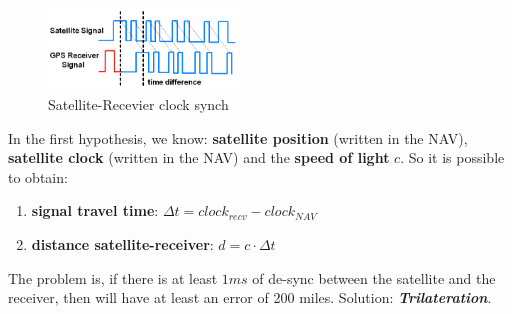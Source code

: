 \begin{figure}[h]
    \centering 
    \includegraphics[width=0.45\textwidth]{img/hp_theory}
    \caption{Satellite-Recevier clock synch}
\end{figure}
In the first hypothesis, we know: \textbf{satellite position} (written in the NAV), \textbf{satellite clock} (written in the NAV) and the \textbf{speed of light} $c$. So it is possible to obtain:
\begin{enumerate}[nosep]
    \item \textbf{signal travel time}: $\Delta t = clock_{recv} - clock_{NAV}$
    \item \textbf{distance satellite-receiver}: $d = c \cdot \Delta t$
\end{enumerate}
The problem is, if there is at least $1ms$ of de-sync between the satellite and the receiver, then will have at least an error of 200 miles.
Solution: \textbf{\textit{Trilateration}}.

